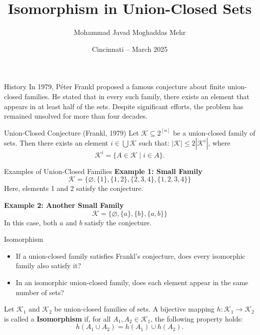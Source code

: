 \documentclass{beamer}
\title{Isomorphism in Union-Closed Sets}
\author{Mohammad Javad Moghaddas Mehr}
\date{Cincinnati – March 2025}
\begin{document}
\begin{frame}
	\titlepage
\end{frame}

\begin{frame}{History}
	In 1979, Péter Frankl proposed a famous conjecture about finite union-closed families.
	He stated that in every such family, there exists an element that appears in at least half of the sets.
	Despite significant efforts, the problem has remained unsolved for more than four decades.
	\vfill
	\pause
	\begin{block}{Union-Closed Conjecture (Frankl, 1979)}
		Let \(\mathcal{K} \subseteq 2^{[n]}\) be a union-closed family of sets.
		Then there exists an element \(i \in \bigcup \mathcal{K}\) such that: \(|\mathcal{K}| \leq 2|\mathcal{K}^i|\),
		where
		\[
			\mathcal{K}^i = \{A \in \mathcal{K} \mid i \in A\}.
		\]
	\end{block}

\end{frame}



\begin{frame}{Examples of Union-Closed Families}
	\textbf{Example 1: Small Family}
	\[
		\mathcal{K} = \{\varnothing, \{1\}, \{1,2\}, \{2,3,4\}, \{1,2,3,4\}\}
	\]
	Here, elements 1 and 2 satisfy the conjecture.

	\vfill
	\pause

	\textbf{Example 2: Another Small Family}
	\[
		\mathcal{K} = \{\varnothing, \{a\}, \{b\}, \{a,b\}\}
	\]
	In this case, both \( a \) and \( b \) satisfy the conjecture.
\end{frame}


\begin{frame}{Isomorphism}
	\begin{itemize}
		\item 	If a union-closed family satisfies Frankl’s conjecture, does every isomorphic family also satisfy it?
		\item  In an isomorphic union-closed family, does each element appear in the same number of sets?

	\end{itemize}

	\vfill
	\pause
	\begin{Definition}
		Let \( \mathcal{K}_1 \) and \( \mathcal{K}_2 \) be union-closed families of sets.
		A bijective mapping \( h: \mathcal{K}_1 \to \mathcal{K}_2 \) is called a \textbf{Isomorphism} if, for all
		\( A_1, A_2 \in \mathcal{K}_1 \), the following property holds:
		\[
			h(A_1 \cup A_2) = h(A_1) \cup h(A_2).
		\]
	\end{Definition}
\end{frame}
\end{document}
